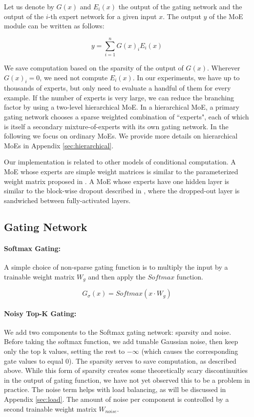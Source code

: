 \documentclass{article}
\begin{document}
Let us denote by $G(x)$ and $E_i(x)$ the output of the gating network and the output of the $i$-th expert network for a given input $x$. The output $y$ of the MoE module can be written as follows:

\begin{equation}
y = \sum_{i=1}^{n}G(x)_iE_i(x)
\end{equation}

We save computation based on the sparsity of the output of $G(x)$.  Wherever $G(x)_i=0$, we need not compute $E_i(x)$.  In our experiments, we have up to thousands of experts, but only need to evaluate a handful of them for every example. If the number of experts is very large, we can reduce the branching factor by using a two-level hierarchical MoE. In a hierarchical MoE, a primary gating network chooses a sparse weighted combination of ``experts", each of which is itself a secondary mixture-of-experts with its own gating network. In the following we focus on ordinary MoEs. We provide more details on hierarchical MoEs in Appendix \ref{sec:hierarchical}.

Our implementation is related to other models of conditional computation. A MoE whose experts are simple weight matrices is similar to the parameterized weight matrix proposed in \citep{Cho14}.  A MoE whose experts have one hidden layer is similar to the block-wise dropout described in \citep{Bengio15:CondComp}, where the dropped-out layer is sandwiched between fully-activated layers.

\subsection{Gating Network}

\paragraph{Softmax Gating:} A simple choice of non-sparse gating function \citep{Jordan1994HME} is to multiply the input by a trainable weight matrix $W_g$ and then apply the $Softmax$ function.

\begin{equation}\label{eq:softmax}
G_\sigma(x) = Softmax(x \cdot W_g)
\end{equation}

\paragraph{Noisy Top-K Gating:}\label{sec:noisytopk} We add two components to the Softmax gating network: sparsity and noise.  Before taking the softmax function, we add tunable Gaussian noise, then keep only the top k values, setting the rest to $-\infty$ (which causes the corresponding gate values to equal $0$).  The sparsity serves to save computation, as described above.  While this form of sparsity creates some theoretically scary discontinuities in the output of gating function, we have not yet observed this to be a problem in practice.  The noise term helps with load balancing, as will be discussed in Appendix \ref{sec:load}.  The amount of noise per component is controlled by a second trainable weight matrix $W_{noise}$.
\end{document}
